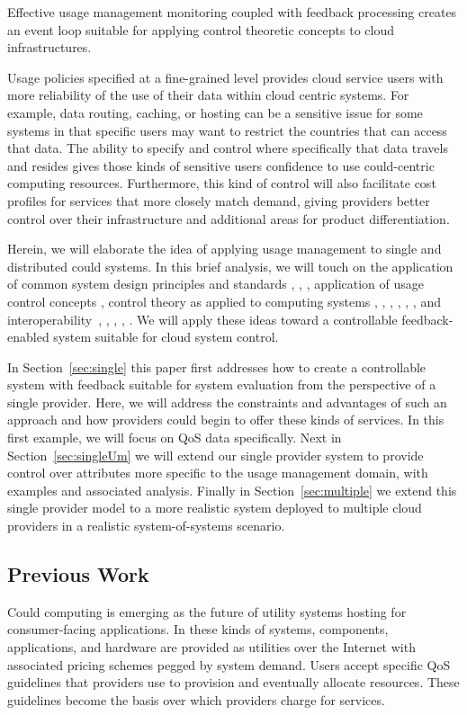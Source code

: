 \documentclass[times, 10pt,twocolumn]{article}
\begin{document}
Effective usage management monitoring coupled with feedback processing creates an event loop suitable for applying control theoretic concepts to cloud infrastructures.

Usage policies specified at a fine-grained level provides cloud service users with more reliability of the use of their data within cloud centric systems.  For example, data routing, caching, or hosting can be a sensitive issue for some systems in that specific users may want to restrict the countries that can access that data.  The ability to specify and control where specifically that data travels and resides gives those kinds of sensitive users confidence to use could-centric computing resources.  Furthermore, this kind of control will also facilitate cost profiles for services that more closely match demand, giving providers better control over their infrastructure and additional areas for product differentiation.

Herein, we will elaborate the idea of applying usage management to single and distributed could systems.  In this brief analysis, we will touch on the application of common system design principles and standards \cite{BlCl:01}, \cite{Cl:88}, \cite{ClWrSoBr:02}, application of usage control concepts \cite{PaSa:04}, control theory as applied to computing systems \cite{ctrl:Zhu:2009:CTB:1496909.1496922}, \cite{ctrl:ariba-GL:2009}, \cite{ctrl:wang-cgswrzh:2009}, \cite{ctrl:kjaer-kr:2009}, \cite{ctrl:abdelwahed-bsk:2009}, \cite{ctrl:hellerstein-sw:2009}, and interoperability~\cite{JaHe:04}, \cite{HeJa:05}, \cite{KoLaMaMi:04}, \cite{coral}, \cite{marlin}.  We will apply these ideas toward a controllable feedback-enabled system suitable for cloud system control.

In Section~\ref{sec:single} this paper first addresses how to create a controllable system with feedback suitable for system evaluation from the perspective of a single provider. Here, we will address the constraints and advantages of such an approach and how providers could begin to offer these kinds of services.  In this first example, we will focus on QoS data specifically.  Next in Section~\ref{sec:singleUm} we will extend our single provider system to provide control over attributes more specific to the usage management domain, with examples and associated analysis.  Finally in Section~\ref{sec:multiple} we extend this single provider model to a more realistic system deployed to multiple cloud providers in a realistic system-of-systems scenario.

\subsection{Previous Work}
Could computing is emerging as the future of utility systems hosting for consumer-facing applications.  In these kinds of systems, components, applications, and hardware are provided as utilities over the Internet with associated pricing schemes pegged by system demand.  Users accept specific QoS guidelines that providers use to provision and eventually allocate resources. These guidelines become the basis over which providers charge for services.
\end{document}
